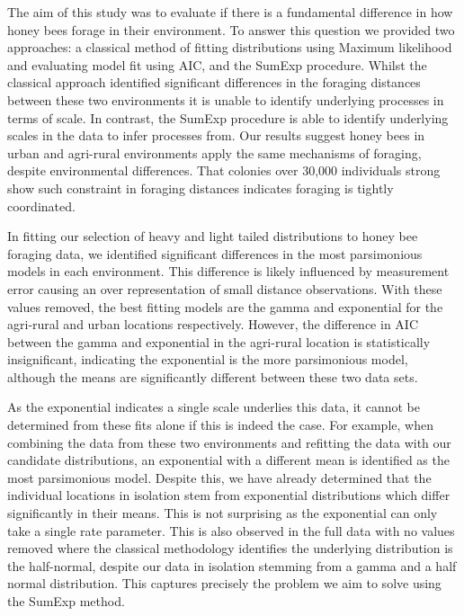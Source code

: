 \documentclass[11pt,usenames,dvipsnames,a4paper]{article}
\begin{document}
\begin{linenumbers}
\hspace{\parindent}
The aim of this study was to evaluate if there is a fundamental difference in how honey bees forage in their environment. To answer this question we provided two approaches: a classical method of fitting distributions using Maximum likelihood and evaluating model fit using AIC, and the SumExp procedure. Whilst the classical approach identified significant differences in the foraging distances between these two environments it is unable to identify underlying processes in terms of scale. In contrast, the SumExp procedure is able to identify underlying scales in the data to infer processes from. Our results suggest honey bees in urban and agri-rural environments apply the same mechanisms of foraging, despite environmental differences. That colonies over 30,000 individuals strong show such constraint in foraging distances indicates foraging is tightly coordinated.

In fitting our selection of heavy and light tailed distributions to honey bee foraging data, we identified significant differences in the most parsimonious models in each environment. This difference is likely influenced by measurement error causing an over representation of small distance observations. With these values removed, the best fitting models are the gamma and exponential for the agri-rural and urban locations respectively. However, the difference in AIC between the gamma and exponential in the agri-rural location is statistically insignificant, indicating the exponential is the more parsimonious model, although the means are significantly different between these two data sets.

As the exponential indicates a single scale underlies this data, it cannot be determined from these fits alone if this is indeed the case. For example, when combining the data from these two environments and refitting the data with our candidate distributions, an exponential with a different mean is identified as the most parsimonious model. Despite this, we have already determined that the individual locations in isolation stem from exponential distributions which differ significantly in their means. This is not surprising as the exponential can only take a single rate parameter. This is also observed in the full data with no values removed where the classical methodology identifies the underlying distribution is the half-normal, despite our data in isolation stemming from a gamma and a half normal distribution. This captures precisely the problem we aim to solve using the SumExp method. 


\end{linenumbers}
\end{document}
